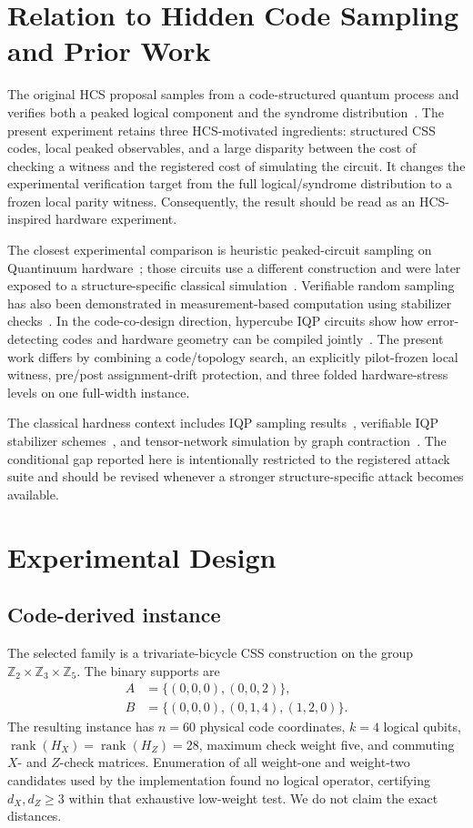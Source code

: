 \documentclass[11pt]{article}
\begin{document}
\section{Relation to Hidden Code Sampling and Prior Work}
The original HCS proposal samples from a code-structured quantum process and verifies both a peaked logical component and the syndrome distribution~\cite{deshpande2025hcs}. The present experiment retains three HCS-motivated ingredients: structured CSS codes, local peaked observables, and a large disparity between the cost of checking a witness and the registered cost of simulating the circuit. It changes the experimental verification target from the full logical/syndrome distribution to a frozen local parity witness. Consequently, the result should be read as an HCS-inspired hardware experiment.

The closest experimental comparison is heuristic peaked-circuit sampling on Quantinuum hardware~\cite{gharibyan2025peaked}; those circuits use a different construction and were later exposed to a structure-specific classical simulation~\cite{kremer2026peaked}. Verifiable random sampling has also been demonstrated in measurement-based computation using stabilizer checks~\cite{ringbauer2024randomsampling}. In the code-co-design direction, hypercube IQP circuits show how error-detecting codes and hardware geometry can be compiled jointly~\cite{hangleiter2024hypercube}. The present work differs by combining a code/topology search, an explicitly pilot-frozen local witness, pre/post assignment-drift protection, and three folded hardware-stress levels on one full-width instance.

The classical hardness context includes IQP sampling results~\cite{bremner2011iqp}, verifiable IQP stabilizer schemes~\cite{bremner2025stabilizer}, and tensor-network simulation by graph contraction~\cite{markov2008tensor,gray2021hyper}. The conditional gap reported here is intentionally restricted to the registered attack suite and should be revised whenever a stronger structure-specific attack becomes available.

\section{Experimental Design}
\subsection{Code-derived instance}
The selected family is a trivariate-bicycle CSS construction on the group $\mathbb{Z}_2\times\mathbb{Z}_3\times\mathbb{Z}_5$. The binary supports are
\begin{align}
 A &= \{(0,0,0),(0,0,2)\}, \\
 B &= \{(0,0,0),(0,1,4),(1,2,0)\}.
\end{align}
The resulting instance has $n=60$ physical code coordinates, $k=4$ logical qubits, $\operatorname{rank}(H_X)=\operatorname{rank}(H_Z)=28$, maximum check weight five, and commuting $X$- and $Z$-check matrices. Enumeration of all weight-one and weight-two candidates used by the implementation found no logical operator, certifying $d_X,d_Z\geq3$ within that exhaustive low-weight test. We do not claim the exact distances.
\end{document}
